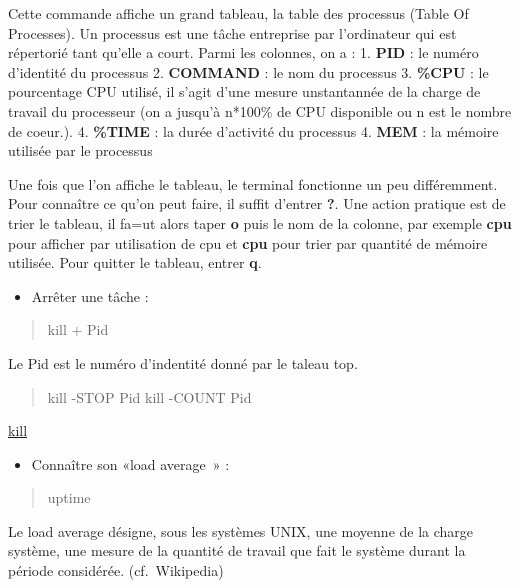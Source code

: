 Cette commande affiche un grand tableau, la table des processus (Table
Of Processes). Un processus est une tâche entreprise par l'ordinateur
qui est répertorié tant qu'elle a court. Parmi les colonnes, on a : 1.
\textbf{PID} : le numéro d'identité du processus 2. \textbf{COMMAND} :
le nom du processus 3. \textbf{\%CPU} : le pourcentage CPU utilisé, il
s'agit d'une mesure unstantannée de la charge de travail du processeur
(on a jusqu'à n*100\% de CPU disponible ou n est le nombre de coeur.).
4. \textbf{\%TIME} : la durée d'activité du processus 4. \textbf{MEM} :
la mémoire utilisée par le processus

Une fois que l'on affiche le tableau, le terminal fonctionne un peu
différemment. Pour connaître ce qu'on peut faire, il suffit d'entrer
\textbf{?}. Une action pratique est de trier le tableau, il fa=ut alors
taper \textbf{o} puis le nom de la colonne, par exemple \textbf{cpu}
pour afficher par utilisation de cpu et \textbf{cpu} pour trier par
quantité de mémoire utilisée. Pour quitter le tableau, entrer
\textbf{q}.

\begin{itemize}
\tightlist
\item
  Arrêter une tâche :
\end{itemize}

\begin{quote}
kill + Pid
\end{quote}

Le Pid est le numéro d'indentité donné par le taleau top.

\begin{quote}
kill -STOP Pid kill -COUNT Pid
\end{quote}

\href{http://osxdaily.com/2013/05/30/pause-resume-app-process-mac-os-x/}{kill}

\begin{itemize}
\tightlist
\item
  Connaître son «load average~» :
\end{itemize}

\begin{quote}
uptime
\end{quote}

Le load average désigne, sous les systèmes UNIX, une moyenne de la
charge système, une mesure de la quantité de travail que fait le système
durant la période considérée. (cf.~Wikipedia)

